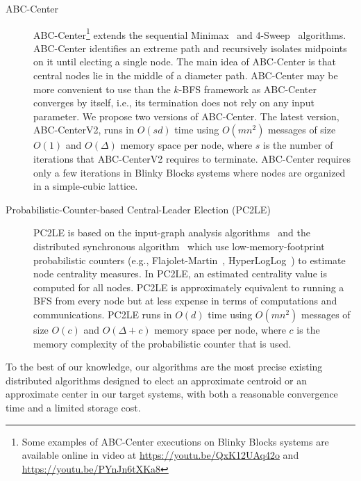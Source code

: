 \begin{description}
\begin{description}
		\item [ABC-Center] ABC-Center\footnote{Some examples of ABC-Center executions on Blinky Blocks systems are available online in video at \url{https://youtu.be/QxK12UAq42o} and \url{https://youtu.be/PYnJn6tXKa8}} extends the sequential Minimax~\cite{handler1973minimax} and 4-Sweep~\cite{crescenzi2013computing} algorithms. ABC-Center identifies an extreme path and recursively isolates midpoints on it until electing a single node. The main idea of ABC-Center is that central nodes lie in the middle of a diameter path. ABC-Center may be more convenient to use than the $k$-BFS framework as ABC-Center converges by itself, i.e., its termination does not rely on any input parameter. We propose two versions of ABC-Center. The latest version, ABC-CenterV2, runs in $O(sd)$ time using $O(mn^2)$ messages of size $O(1)$ and $O(\Delta)$ memory space per node, where $s$ is the number of iterations that ABC-CenterV2 requires to terminate. ABC-Center requires only a few iterations in Blinky Blocks systems where nodes are organized in a simple-cubic lattice.
		\item [Probabilistic-Counter-based Central-Leader Election (PC2LE)] PC2LE is based on the input-graph analysis algorithms~\cite{kang2011centralities,kang2011hadi} and the distributed synchronous algorithm~\cite{garin2012distributed} which use low-memory-footprint probabilistic counters (e.g., Flajolet-Martin~\cite{flajolet1985probabilistic}, HyperLogLog~\cite{flajolet2007hyperloglog}) to estimate node centrality measures. In PC2LE, an estimated centrality value is computed for all nodes. PC2LE is approximately equivalent to running a BFS from every node but at less expense in terms of computations and communications. PC2LE runs in $O(d)$ time using $O(mn^2)$ messages of size $O(c)$ and $O(\Delta + c)$ memory space per node, where $c$ is the memory complexity of the probabilistic counter that is used.
	\end{description}
	To the best of our knowledge, our algorithms are the most precise existing distributed algorithms designed to elect an approximate centroid or an approximate center in our target systems, with both a reasonable convergence time and a limited storage cost.


\end{description}
